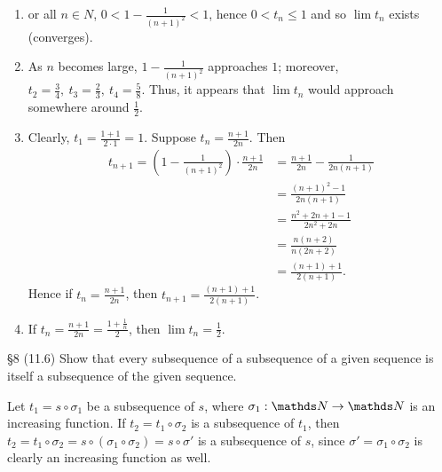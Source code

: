\documentclass{homework}
\begin{document}
\begin{solution}
  \begin{enumerate}[label=(\alph*)]
    \item  or all $n\in N$, $0<1-\frac{1}{(n+1)^2}<1$, hence $0<t_n\le 1$ and so $\lim{t_n}$ exists
      (converges).
    \item As $n$ becomes large, $1-\frac{1}{(n+1)^2}$ approaches $1$; moreover, $t_2=\frac{3}{4},\
      t_3=\frac{2}{3},\ t_4=\frac{5}{8}$. Thus, it appears that $\lim{t_n}$ would approach somewhere
      around $\frac{1}{2}$.
    \item Clearly, $t_1=\frac{1+1}{2\cdot 1}=1$. Suppose $t_n=\frac{n+1}{2n}$. Then
      \begin{align*}
        t_{n+1}=\left( 1-\frac{1}{(n+1)^2} \right)\cdot \frac{n+1}{2n}
          &= \frac{n+1}{2n}-\frac{1}{2n(n+1)} \\
          &= \frac{(n+1)^2-1}{2n(n+1)}\\
          &= \frac{n^2+2n+1-1}{2n^2+2n} \\
          &= \frac{n(n+2)}{n(2n+2)} \\
          &= \frac{(n+1)+1}{2(n+1)}
      .\end{align*}
      Hence if $t_n=\frac{n+1}{2n}$, then $t_{n+1}=\frac{(n+1)+1}{2(n+1)}$.
    \item If $t_n=\frac{n+1}{2n}=\frac{1+\frac{1}{n}}{2}$, then $\lim{t_n}=\frac{1}{2}$.
  \end{enumerate}
\end{solution}

\begin{problem}{\S 8}
  (11.6) Show that every subsequence of a subsequence of a given sequence is itself a subsequence of
  the given sequence.
\end{problem}
\begin{solution}
  Let $ t_1=s\circ \sigma_1$ be a subsequence of $s$, where $\sigma_1:\N\to \N$ is an increasing
  function. If $t_2=t_1\circ \sigma_2$ is a subsequence of $ t_1$, then $t_2=t_1\circ
  \sigma_2=s\circ (\sigma_1\circ \sigma_2)=s\circ \sigma'$ is a subsequence of $s$, since
  $\sigma'=\sigma_1\circ \sigma_2$ is clearly an increasing function as well.
\end{solution}
\end{document}
